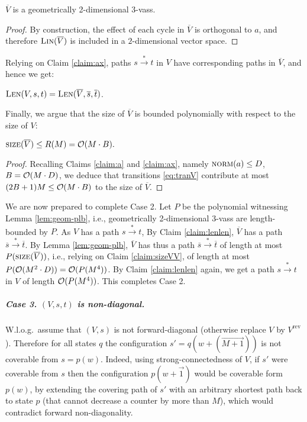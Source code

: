 \documentclass[a4paper, UKenglish, cleveref, autoref, thm-restate]{lipics-v2021}
\newcommand{\trans}[1]{\stackrel{#1}{\longrightarrow}}
\newcommand{\tran}{\trans{*}}
\newcommand{\norm}{\textsc{norm}}
\newcommand{\size}{\textsc{size}}
\renewcommand{\vec}[1]{\overrightarrow{#1}}
\newcommand{\lb}{length-bounded\xspace}
\newcommand{\Lin}[1]{\textsc{Lin}(#1)}
\newcommand{\Len}[3]{\textsc{Len}(#1, #2, #3)}
\newcommand{\OO}{{\cal O}}
\newcommand{\vass}{{\sc vass}\xspace}
\newcommand{\tvass}{\parvass 3}
\newcommand{\geomvass}{geometrically 2-dimensional \tvass}
\newcommand{\parvass}[1]{{$#1$-\vass}\xspace}
\newcommand{\para}[1]{\vspace{-3mm}\subparagraph*{\bf #1.}}
\newcommand{\Wlog}{W.l.o.g.~}
\newcommand{\rev}[1]{{#1}^{\text{rev}}}
\newcommand{\essdvass}[1]{\overline{#1}}
\begin{document}
\begin{claim}\label{clm:trim_makes_geom}
$\essdvass V$ is a \geomvass.
\end{claim}

\begin{proof}
By construction, the effect of each cycle in $\essdvass V$ is orthogonal to $a$, and therefore 
$\Lin {\essdvass V}$ is included in a $2$-dimensional vector space.
\end{proof}
Relying on Claim \ref{claim:ax}, paths $s\tran t$ in $V$ have corresponding paths in $\essdvass V$,
and hence we get:
\begin{claim} \label{claim:lenlen}
$\Len V s t = \Len {\essdvass V} {\essdvass s} {\essdvass t}$.
\end{claim}
Finally, we argue that the size of $\essdvass V$ is bounded polynomially with respect to the size of $V$:
\begin{claim} \label{claim:sizeVV}
$\size(\essdvass V) \leq R(M) = \OO(M\cdot B).$
\end{claim}
\begin{proof}
Recalling Claims \ref{claim:a} and \ref{claim:ax}, namely
$\norm(a)\leq D$, $B=\OO(M\cdot D)$, we deduce that 
transitions \eqref{eq:tranV} contribute at most $(2B+1)M \leq \OO(M\cdot B)$ to the size of $\essdvass V$.
\end{proof}
We are now prepared to complete Case 2.
Let $P$ be the polynomial witnessing Lemma \ref{lem:geom-plb}, i.e.,
\geomvass are \lb by $P$.
As $V$ has a path $s\tran t$, 
By Claim \ref{claim:lenlen}, $\essdvass V$ has a path $\essdvass s \tran \essdvass t$.
By Lemma \ref{lem:geom-plb}, $\essdvass V$ has thus a path $\essdvass s \tran \essdvass t$
of length at most $P(\size(\essdvass V))$, i.e., relying on Claim \ref{claim:sizeVV},
of length at most $P(\OO(M^2\cdot D)) = \OO(P(M^{4}))$.
By Claim \ref{claim:lenlen} again, we get a path $s\tran t$ in $V$ of length
$\OO(P(M^{4}))$.
This completes Case 2.


\para{Case 3. $(V, s, t)$ is non-diagonal}

\Wlog assume that $(V, s)$ is not forward-diagonal (otherwise replace $V$ by $\rev V$).
Therefore for all states $q$ the configuration $s'=q(w+(\vec{M{+}1}))$ is not
coverable from $s=p(w)$. 
Indeed, using strong-connectedness of $V$, if $s'$ were coverable from $s$ then
the configuration $p(w + \vec 1)$ would be coverable form $p(w)$, by 
extending the covering path of $s'$ with an arbitrary shortest path back to state $p$ 
(that cannot decrease a counter by more than $M$), which would contradict forward non-diagonality.
\end{document}
